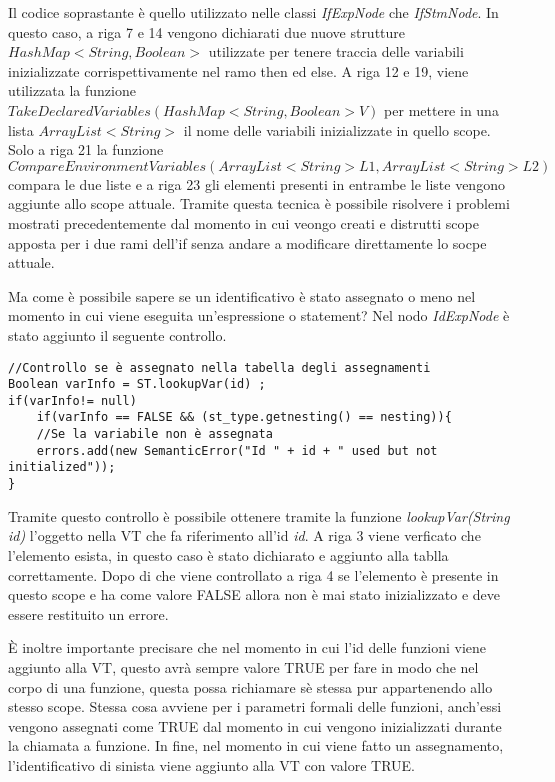 Il codice soprastante è quello utilizzato nelle classi \textit{IfExpNode} che \textit{IfStmNode}. In questo caso, a riga 7 e 14 vengono dichiarati due nuove strutture \textit{$HashMap<String, Boolean>$} utilizzate per tenere traccia delle variabili inizializzate corrispettivamente nel ramo then ed else. A riga 12 e 19, viene utilizzata la funzione \textit{$TakeDeclaredVariables(HashMap<String, Boolean> V)$} per mettere in una lista \textit{$ArrayList<String>$} il nome delle variabili inizializzate in quello scope. Solo a riga 21 la funzione  \textit{$CompareEnvironmentVariables(ArrayList<String> L1, ArrayList<String> L2)$} compara le due liste e a riga 23 gli elementi presenti in entrambe le liste vengono aggiunte allo scope attuale. Tramite questa tecnica è possibile risolvere i problemi mostrati precedentemente dal momento in cui veongo creati e distrutti scope apposta per i due rami dell'if senza andare a modificare direttamente lo socpe attuale.

Ma come è possibile sapere se un identificativo è stato assegnato o meno nel momento in cui viene eseguita un'espressione o statement? Nel nodo \textit{IdExpNode} è stato aggiunto il seguente controllo.
\begin{verbatim}
//Controllo se è assegnato nella tabella degli assegnamenti
Boolean varInfo = ST.lookupVar(id) ; 
if(varInfo!= null)
    if(varInfo == FALSE && (st_type.getnesting() == nesting)){ 
    //Se la variabile non è assegnata
    errors.add(new SemanticError("Id " + id + " used but not initialized"));
}
\end{verbatim}
Tramite questo controllo è possibile ottenere tramite la funzione \textit{lookupVar(String id)} l'oggetto nella VT che fa riferimento all'id \textit{id}. A riga 3 viene verficato che l'elemento esista, in questo caso è stato dichiarato e aggiunto alla tablla correttamente. Dopo di che viene controllato a riga 4 se l'elemento è presente in questo scope e ha come valore FALSE allora non è mai stato inizializzato e deve essere restituito un errore.

È inoltre importante precisare che nel momento in cui l'id delle funzioni viene aggiunto alla VT, questo avrà sempre valore TRUE per fare in modo che nel corpo di una funzione, questa possa richiamare sè stessa pur appartenendo allo stesso scope. Stessa cosa avviene per i parametri formali delle funzioni, anch'essi vengono assegnati come TRUE dal momento in cui vengono inizializzati durante la chiamata a funzione. In fine, nel momento in cui viene fatto un assegnamento, l'identificativo di sinista viene aggiunto alla VT con valore TRUE.

